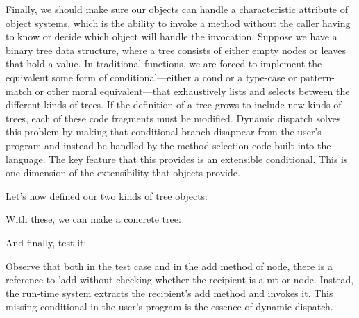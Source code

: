 
Finally, we should make sure our objects can handle a characteristic attribute
of object systems, which is the ability to invoke a method without the caller
having to know or decide which object will handle the invocation. Suppose we
have a binary tree data structure, where a tree consists of either empty nodes
or leaves that hold a value. In traditional functions, we are forced to
implement the equivalent some form of conditional—either a cond or a type-case
or pattern-match or other moral equivalent—that exhaustively lists and selects
between the different kinds of trees. If the definition of a tree grows to
include new kinds of trees, each of these code fragments must be modified.
Dynamic dispatch solves this problem by making that conditional branch disappear
from the user’s program and instead be handled by the method selection code
built into the language. The key feature that this provides is an extensible
conditional. This is one dimension of the extensibility that objects provide.

Let’s now defined our two kinds of tree objects:

With these, we can make a concrete tree:

And finally, test it:

Observe that both in the test case and in the add method of node, there is a
reference to 'add without checking whether the recipient is a mt or node.
Instead, the run-time system extracts the recipient’s add method and invokes it.
This missing conditional in the user’s program is the essence of dynamic
dispatch.
